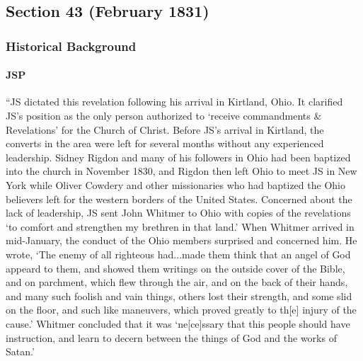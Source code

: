 \subsection{Section 43 (February 1831)}
	\label{DC43}
	
	\subsubsection{Historical Background}
		\label{DC43-HB}
		
		\paragraph{JSP}
		
			``JS dictated this revelation following his arrival in Kirtland, Ohio. It clarified JS's position as the only person authorized to `receive commandments \& Revelations' for the Church of Christ. Before JS's arrival in Kirtland, the converts in the area were left for several months without any experienced leadership. Sidney Rigdon and many of his followers in Ohio had been baptized into the church in November 1830, and Rigdon then left Ohio to meet JS in New York while Oliver Cowdery and other missionaries who had baptized the Ohio believers left for the western borders of the United States. Concerned about the lack of leadership, JS sent John Whitmer to Ohio with copies of the revelations `to comfort and strengthen my brethren in that land.' When Whitmer arrived in mid-January, the conduct of the Ohio members surprised and concerned him. He wrote, `The enemy of all righteous had...made them think that an angel of God appeard to them, and showed them writings on the outside cover of the Bible, and on parchment, which flew through the air, and on the back of their hands, and many such foolish and vain things, others lost their strength, and some slid on the floor, and such like maneuvers, which proved greatly to th[e] injury of the cause.' Whitmer concluded that it was `ne[ce]ssary that this people should have instruction, and learn to decern between the things of God and the works of Satan.'

